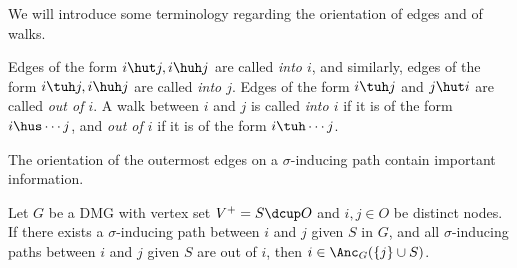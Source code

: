 We will introduce some terminology regarding the orientation of edges and of walks.
\begin{Def}
Edges of the form $i \hut j, i \huh j$ are called \emph{into $i$}, and similarly, edges of the form $i \tuh j, i \huh j$ are called \emph{into $j$}. 
Edges of the form $i \tuh j$ and $j \hut i$ are called \emph{out of $i$}.
A walk between $i$ and $j$ is called \emph{into $i$} if it is of the form $i \hus \cdots j$, and \emph{out of $i$} if it is of the form $i \tuh \cdots j$.
\end{Def}
The orientation of the outermost edges on a $\sigma$-inducing path contain important information.
\begin{Lem}\label{lem:sigma-inducing_paths_out_of}
  Let $G$ be a DMG with vertex set $V^+ = S \dcup O$ and $i,j \in O$ be distinct nodes.
  If there exists a $\sigma$-inducing path between $i$ and $j$ given $S$ in $G$,
  and all $\sigma$-inducing paths between $i$ and $j$ given $S$ are out of $i$, then
    $i \in \Anc_G(\{j\} \cup S)$.
\end{Lem}
